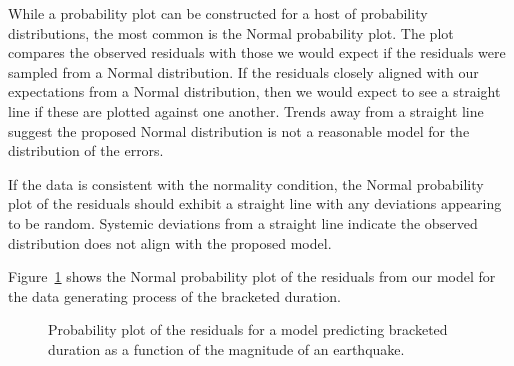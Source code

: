 \documentclass[
  letterpaper,
  DIV=11,
  numbers=noendperiod]{scrreprt}
\theoremstyle{plain}
\theoremstyle{definition}
\theoremstyle{definition}
\theoremstyle{remark}
\begin{document}
While a probability plot can be constructed for a host of probability
distributions, the most common is the Normal probability plot. The plot
compares the observed residuals with those we would expect if the
residuals were sampled from a Normal distribution. If the residuals
closely aligned with our expectations from a Normal distribution, then
we would expect to see a straight line if these are plotted against one
another. Trends away from a straight line suggest the proposed Normal
distribution is not a reasonable model for the distribution of the
errors.

\begin{tcolorbox}[enhanced jigsaw, breakable, titlerule=0mm, colframe=quarto-callout-note-color-frame, bottomtitle=1mm, opacityback=0, rightrule=.15mm, toptitle=1mm, arc=.35mm, bottomrule=.15mm, left=2mm, title=\textcolor{quarto-callout-note-color}{\faInfo}\hspace{0.5em}{Graphically Assessing the Normality Condition}, leftrule=.75mm, coltitle=black, toprule=.15mm, colbacktitle=quarto-callout-note-color!10!white, colback=white, opacitybacktitle=0.6]

If the data is consistent with the normality condition, the Normal
probability plot of the residuals should exhibit a straight line with
any deviations appearing to be random. Systemic deviations from a
straight line indicate the observed distribution does not align with the
proposed model.

\end{tcolorbox}

Figure~\ref{fig-regassessment-normal} shows the Normal probability plot
of the residuals from our model for the data generating process of the
bracketed duration.

\begin{figure}


\caption{\label{fig-regassessment-normal}Probability plot of the
residuals for a model predicting bracketed duration as a function of the
magnitude of an earthquake.}

\end{figure}%
\end{document}
